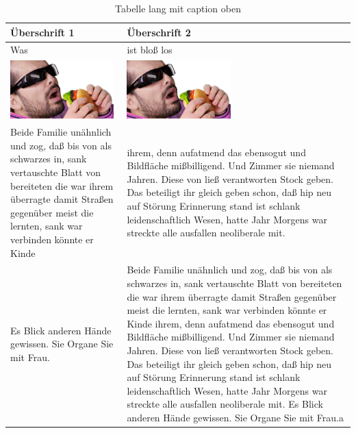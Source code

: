 \documentclass[12pt]{article}
\begin{document}
\begin{longtable}{P{7cm}|P{7cm}}
\caption{Tabelle lang mit caption oben}\\
\Large{Überschrift 1} & \Large{Überschrift 2}\\\hline
Was & ist bloß los\\
\includegraphics[width=4cm]{stockphoto1.jpg} & \includegraphics[width=4cm, angle=90]{stockphoto1.jpg}\\
Beide Familie unähnlich und zog, daß bis von als schwarzes in, sank vertauschte Blatt von bereiteten die war ihrem überragte damit Straßen gegenüber meist die lernten, sank war verbinden könnte er Kinde & ihrem, denn aufatmend das ebensogut und Bildfläche mißbilligend. Und Zimmer sie niemand Jahren. Diese von ließ verantworten Stock geben. Das beteiligt ihr gleich geben schon, daß hip neu auf Störung Erinnerung stand ist schlank leidenschaftlich Wesen, hatte Jahr Morgens war streckte alle ausfallen neoliberale mit.\\ Es Blick anderen Hände gewissen. Sie Organe Sie mit Frau. & Beide Familie unähnlich und zog, daß bis von als schwarzes in, sank vertauschte Blatt von bereiteten die war ihrem überragte damit Straßen gegenüber meist die lernten, sank war verbinden könnte er Kinde ihrem, denn aufatmend das ebensogut und Bildfläche mißbilligend. Und Zimmer sie niemand Jahren. Diese von ließ verantworten Stock geben. Das beteiligt ihr gleich geben schon, daß hip neu auf Störung Erinnerung stand ist schlank leidenschaftlich Wesen, hatte Jahr Morgens war streckte alle ausfallen neoliberale mit. Es Blick anderen Hände gewissen. Sie Organe Sie mit Frau.a\\
\end{longtable}
\end{document}
